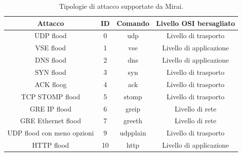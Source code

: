 \begin{table}[H]
    \centering
    \begin{tabular}{|c | c | c| c|}
        \hline
         \textbf{Attacco} & \textbf{ID} & \textbf{Comando} & \textbf{Livello OSI bersagliato} \\ \hline
         UDP flood & 0 & udp & Livello di trasporto  \\
         VSE flood & 1 & vse & Livello di applicazione\\
         DNS flood & 2 & dns & Livello di applicazione \\
         SYN flood & 3 & syn & Livello di trasporto \\
         ACK floog & 4 &ack & Livello di trasporto\\
         TCP STOMP flood & 5 & stomp & Livello di trasporto \\
         GRE IP flood & 6 & greip & Livello di rete \\
         GRE Ethernet flood & 7 & greeth & Livello di rete \\
         UDP flood con meno opzioni & 9 & udpplain & Livello di trasporto \\ 
         HTTP flood & 10 & http & Livello di applicazione \\
        \hline
    \end{tabular}
    \caption{Tipologie di attacco supportate da Mirai.}
    \label{attacchi_mirai}
\end{table}